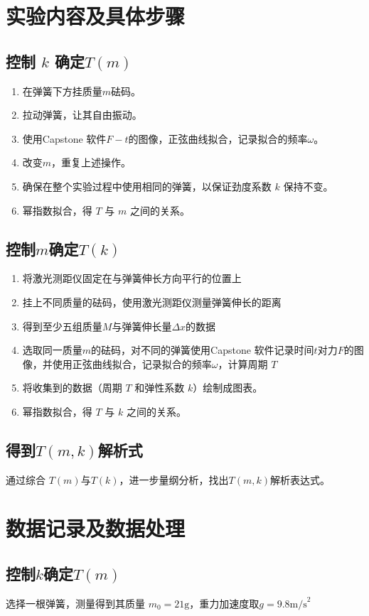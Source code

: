 \documentclass[a4paper,zihao=5,UTF8,fontset=fandol]{../phyreport}
\begin{document}
\section{实验内容及具体步骤}
\subsection{控制 $k$ 确定$T(m)$}
\begin{enumerate}
	\item 在弹簧下方挂质量$m$砝码。
	\item 拉动弹簧，让其自由振动。
	\item 使用Capstone 软件$F-t$的图像，正弦曲线拟合，记录拟合的频率$\omega$。
	\item 改变$m$，重复上述操作。
	\item 确保在整个实验过程中使用相同的弹簧，以保证劲度系数 \(k\) 保持不变。
	\item 幂指数拟合，得 \(T\) 与 \(m\) 之间的关系。
\end{enumerate}

\subsection{控制$m$确定$T(k)$}
\begin{enumerate}
	\item 将激光测距仪固定在与弹簧伸长方向平行的位置上
	\item 挂上不同质量的砝码，使用激光测距仪测量弹簧伸长的距离
	\item 得到至少五组质量$M$与弹簧伸长量$\Delta x$的数据
	\item 选取同一质量$m$的砝码，对不同的弹簧使用Capstone 软件记录时间$t$对力$F$的图像，并使用正弦曲线拟合，记录拟合的频率$\omega$，计算周期 \(T\)
	\item 将收集到的数据（周期 \(T\) 和弹性系数 \(k\)）绘制成图表。
	\item 幂指数拟合，得 \(T\) 与 \(k\) 之间的关系。
\end{enumerate}

\subsection{得到$T(m,k)$解析式}
通过综合 $T(m)$与$T(k)$，进一步量纲分析，找出$T(m,k)$解析表达式。

\longLine
\section{数据记录及数据处理}
\subsection{控制$k$确定$T(m)$}
选择一根弹簧，测量得到其质量 $m_0=21 \text{g}$，重力加速度取$g= 9.8 \text{m/s}^2$
\end{document}
